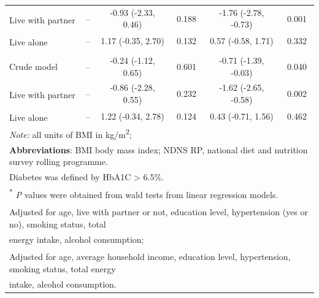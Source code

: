 \begin{table}[H]
\begin{tabular}[t]{lccccc}
		\hspace{1em}\hspace{1em}Live with partner\textsuperscript{\ddag} & -- & -0.93 (-2.33, 0.46) & 0.188 & -1.76 (-2.78, -0.73) & 0.001\\
		\hspace{1em}\hspace{1em}Live alone\textsuperscript{\ddag} & -- & 1.17 (-0.35, 2.70) & 0.132 & 0.57 (-0.58, 1.71) & 0.332\\
		\addlinespace[0.3em]
		\multicolumn{6}{l}{\hspace{1em}\textbf{BMI in non-diabetics}}\\
		\hspace{1em}\hspace{1em}Crude model & -- & -0.24 (-1.12, 0.65) & 0.601 & -0.71 (-1.39, -0.03) & 0.040\\
		\hspace{1em}\hspace{1em}Live with partner\textsuperscript{\ddag} & -- & -0.86 (-2.28, 0.55) & 0.232 & -1.62 (-2.65, -0.58) & 0.002\\
		\hspace{1em}\hspace{1em}Live alone\textsuperscript{\ddag} & -- & 1.22 (-0.34, 2.78) & 0.124 & 0.43 (-0.71, 1.56) & 0.462\\
    	\bottomrule
		\multicolumn{6}{l}{{\scriptsize \textit{Note: }all units of BMI in kg/m\textsuperscript{2};}}\\
		\multicolumn{6}{l}{{\scriptsize \textbf{Abbreviations}: BMI body mass index; NDNS RP, national diet and nutrition survey rolling programme.}}\\
		\multicolumn{6}{l}{{\scriptsize Diabetes was defined by HbA1C > 6.5\%.}}\\
		\multicolumn{6}{l}{{\scriptsize \textsuperscript{*} \textit{P} values were obtained from wald tests from linear regression models.}}\\
		\multicolumn{6}{l}{{\scriptsize \textsuperscript{\dag} Adjusted for age, live with partner or not, education level, hypertension (yes or no), smoking status, total }}\\
		\multicolumn{6}{l}{{\scriptsize  energy intake, alcohol consumption;}}\\
		\multicolumn{6}{l}{{\scriptsize \textsuperscript{\ddag} Adjusted for age, average household income, education level, hypertension, smoking status, total energy}}\\ 
		\multicolumn{6}{l}{{\scriptsize  intake, alcohol consumption.}}\\
	\end{tabular}
\end{table}

